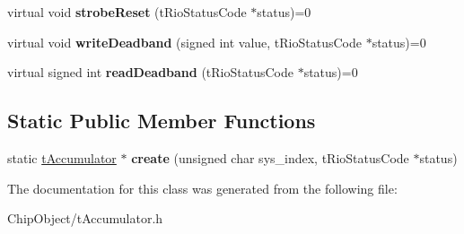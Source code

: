 \begin{DoxyCompactItemize}
\item 
\hypertarget{classnFPGA_1_1nFRC__2012__1__6__4_1_1tAccumulator_a11bb93d66ef5ddbe3b33f552726ef2e7}{
virtual void {\bfseries strobeReset} (tRioStatusCode $\ast$status)=0}
\label{classnFPGA_1_1nFRC__2012__1__6__4_1_1tAccumulator_a11bb93d66ef5ddbe3b33f552726ef2e7}

\item 
\hypertarget{classnFPGA_1_1nFRC__2012__1__6__4_1_1tAccumulator_a810a322838f77acc07910ea7aa97cc73}{
virtual void {\bfseries writeDeadband} (signed int value, tRioStatusCode $\ast$status)=0}
\label{classnFPGA_1_1nFRC__2012__1__6__4_1_1tAccumulator_a810a322838f77acc07910ea7aa97cc73}

\item 
\hypertarget{classnFPGA_1_1nFRC__2012__1__6__4_1_1tAccumulator_ae72f1367c15e021c6c6cbe86626a0a54}{
virtual signed int {\bfseries readDeadband} (tRioStatusCode $\ast$status)=0}
\label{classnFPGA_1_1nFRC__2012__1__6__4_1_1tAccumulator_ae72f1367c15e021c6c6cbe86626a0a54}

\end{DoxyCompactItemize}
\subsection*{Static Public Member Functions}
\begin{DoxyCompactItemize}
\item 
\hypertarget{classnFPGA_1_1nFRC__2012__1__6__4_1_1tAccumulator_a6a6654455814a6e2e6030087b5ea2ffd}{
static \hyperlink{classnFPGA_1_1nFRC__2012__1__6__4_1_1tAccumulator}{tAccumulator} $\ast$ {\bfseries create} (unsigned char sys\_\-index, tRioStatusCode $\ast$status)}
\label{classnFPGA_1_1nFRC__2012__1__6__4_1_1tAccumulator_a6a6654455814a6e2e6030087b5ea2ffd}

\end{DoxyCompactItemize}


The documentation for this class was generated from the following file:\begin{DoxyCompactItemize}
\item 
ChipObject/tAccumulator.h\end{DoxyCompactItemize}

